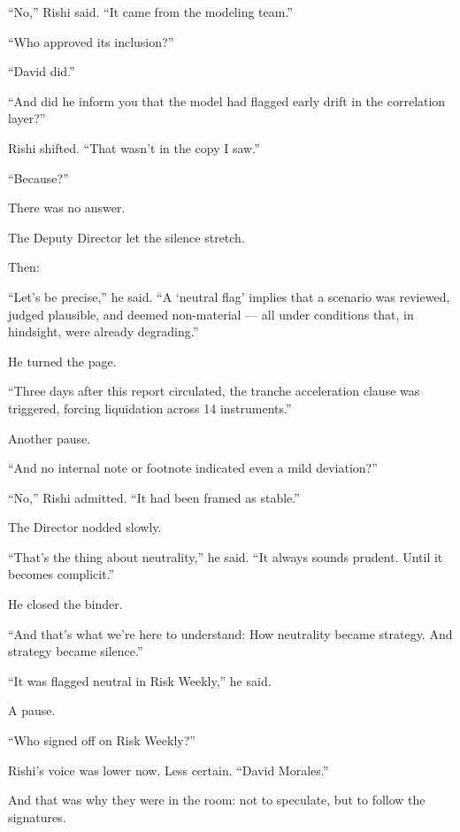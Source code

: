 “No,” Rishi said. “It came from the modeling team.”

“Who approved its inclusion?”

“David did.”

“And did he inform you that the model had flagged early drift in the correlation layer?”

Rishi shifted. “That wasn’t in the copy I saw.”

“Because?”

There was no answer.

The Deputy Director let the silence stretch.

Then:

“Let’s be precise,” he said. “A ‘neutral flag’ implies that a scenario was reviewed, judged plausible, and deemed 
non-material — all under conditions that, in hindsight, were already degrading.”

He turned the page.

“Three days after this report circulated, the tranche acceleration clause was triggered, forcing liquidation across 
14 instruments.”

Another pause.

“And no internal note or footnote indicated even a mild deviation?”

“No,” Rishi admitted. “It had been framed as stable.”

The Director nodded slowly.

“That’s the thing about neutrality,” he said. “It always sounds prudent. Until it becomes complicit.”

He closed the binder.

“And that’s what we’re here to understand:
How neutrality became strategy.
And strategy became silence.”

“It was flagged neutral in Risk Weekly,” he said.

A pause.

“Who signed off on Risk Weekly?”

Rishi’s voice was lower now. Less certain.
“David Morales.”

And that was why they were in the room: not to speculate, but to follow the signatures.

\medskip

